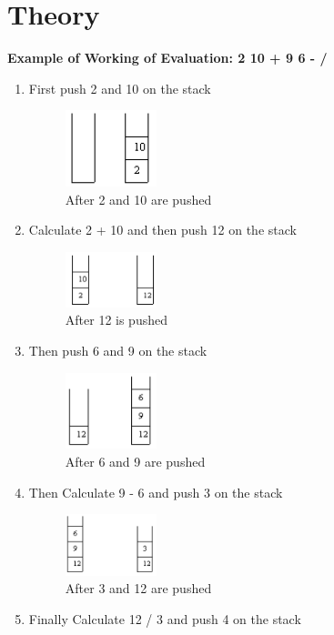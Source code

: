 \documentclass[11pt]{article}
\begin{document}
\section{Theory}
\textbf{Example of Working of Evaluation: 2 10 + 9 6 - /}\\
\begin{enumerate}
	\item First push 2 and 10 on the stack\\
	      \begin{figure}[H]
		      \centering
		      \includegraphics[width=0.25\textwidth]{stack 1.png}
		      \caption{After 2 and 10 are pushed}
	      \end{figure}
	\item Calculate 2 + 10 and then push 12 on the stack\\

	      \begin{figure}[H]
		      \centering
		      \includegraphics[width=0.25\textwidth]{stack 2.png}
		      \caption{After 12 is pushed}
	      \end{figure}
	\item Then push 6 and 9 on the stack\\

	      \begin{figure}[H]
		      \centering
		      \includegraphics[width=0.25\textwidth]{stack 3.png}
		      \caption{After 6 and 9 are pushed}
	      \end{figure}
	\item Then Calculate 9 - 6 and push 3 on the stack\\

	      \begin{figure}[H]
		      \centering
		      \includegraphics[width=0.25\textwidth]{stack 4.png}
		      \caption{After 3 and 12 are pushed}
	      \end{figure}
	\item Finally Calculate 12 / 3 and push 4 on the stack\\


\end{enumerate}
\end{document}
